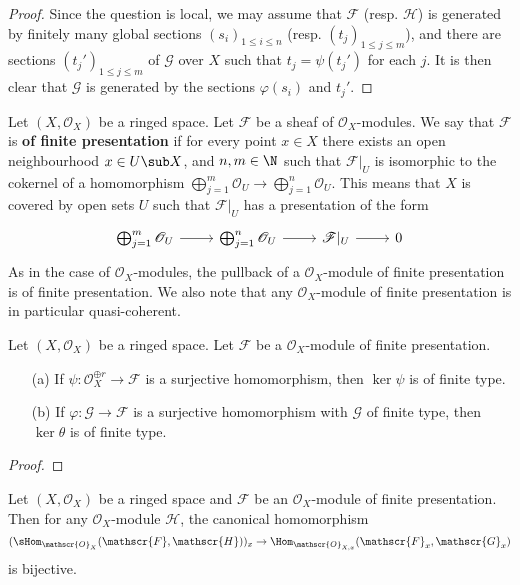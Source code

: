 \begin{proof}
Since the question is local, we may assume that $\mathscr{F}$ (resp. $\mathscr{H}$) is generated by finitely many global sections $(s_i)_{1\leq i\leq n}$ (resp. $(t_j)_{1\leq j\leq m}$), and there are sections $(t_j')_{1\leq j\leq m}$ of $\mathscr{G}$ over $X$ such that $t_j=\psi(t_j')$ for each $j$. It is then clear that $\mathscr{G}$ is generated by the sections $\varphi(s_i)$ and $t_j'$.
\end{proof}
Let $(X,\mathscr{O}_X)$ be a ringed space. Let $\mathscr{F}$ be a sheaf of $\mathscr{O}_X$-modules. We say that $\mathscr{F}$ is \textbf{of finite presentation} if for every point $x\in X$ there exists an open neighbourhood $x\in U\sub X$, and $n,m\in\N$ such that $\mathscr{F}|_U$ is isomorphic to the cokernel of a homomorphism $\bigoplus_{j=1}^{m}\mathscr{O}_U\to \bigoplus_{j=1}^{n}\mathscr{O}_U$. This means that $X$ is covered by open sets $U$ such that $\mathscr{F}|_U$ has a presentation of the form
\[\begin{tikzcd}
\bigoplus_{j=1}^{m}\mathscr{O}_U\ar[r]&\bigoplus_{j=1}^{n}\mathscr{O}_U\ar[r]&\mathscr{F}|_U\ar[r]&0
\end{tikzcd}\]
As in the case of $\mathscr{O}_X$-modules, the pullback of a $\mathscr{O}_X$-module of finite presentation is of finite presentation. We also note that any $\mathscr{O}_X$-module of finite presentation is in particular quasi-coherent.
\begin{proposition}\label{sheaf of module fp prop}
Let $(X,\mathscr{O}_X)$ be a ringed space. Let $\mathscr{F}$ be a $\mathscr{O}_X$-module of finite presentation.
\begin{itemize}
\item[(a)] If $\psi:\mathscr{O}_X^{\oplus r}\to\mathscr{F}$ is a surjective homomorphism, then $\ker\psi$ is of finite type.
\item[(b)] If $\varphi:\mathscr{G}\to\mathscr{F}$ is a surjective homomorphism with $\mathscr{G}$ of finite type, then $\ker\theta$ is of finite type.
\end{itemize}
\end{proposition}
\begin{proof}

\end{proof}
\begin{proposition}\label{sheaf of module fp sheaf Hom bijective on stalk}
Let $(X,\mathscr{O}_X)$ be a ringed space and $\mathscr{F}$ be an $\mathscr{O}_X$-module of finite presentation. Then for any $\mathscr{O}_X$-module $\mathscr{H}$, the canonical homomorphism
\[(\sHom_{\mathscr{O}_X}(\mathscr{F},\mathscr{H}))_x\to\Hom_{\mathscr{O}_{X,x}}(\mathscr{F}_{x},\mathscr{G}_x)\]
is bijective.
\end{proposition}
